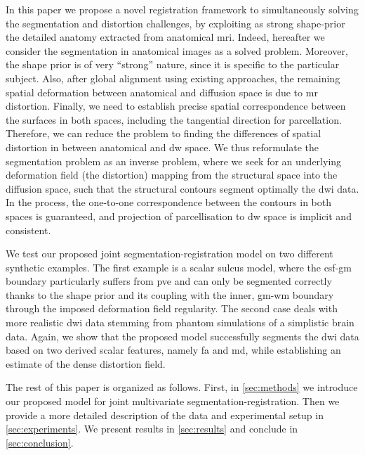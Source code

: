 In this paper we propose a novel registration framework to simultaneously
solving the segmentation and distortion challenges, by exploiting as strong 
shape-prior the detailed anatomy extracted from anatomical \gls{mri}. Indeed,
hereafter we consider the segmentation in anatomical images as a solved problem.
Moreover, the shape prior is of very ``strong'' nature, since it is specific to 
the particular subject. Also, after global alignment using existing approaches, 
the remaining spatial deformation between anatomical and diffusion space is 
due to \gls{mr} distortion. Finally, we need to establish precise spatial 
correspondence between the surfaces in both spaces, including the tangential 
direction for parcellation. Therefore, we can reduce the problem to finding 
the differences of spatial distortion in between anatomical and \gls{dw} space.
We thus reformulate the segmentation problem as an inverse problem, where we 
seek for an underlying deformation field (the distortion) mapping 
from the structural space into the diffusion space, such that the structural 
contours segment optimally the \gls{dwi} data. In the process, the one-to-one 
correspondence between the contours in both spaces is guaranteed, and projection 
of parcellisation to \gls{dw} space is implicit and consistent.

We test our proposed joint segmentation-registration model on two different 
synthetic examples. The first example is a scalar sulcus model, where the 
\gls{csf}-\gls{gm} boundary particularly suffers from \gls{pve} and can only be 
segmented correctly thanks to the shape prior and its coupling with the inner, 
\gls{gm}-\gls{wm} boundary through the imposed deformation field regularity. 
The second case deals with more realistic \gls{dwi} data stemming from 
phantom simulations of a simplistic brain data. Again, we show that the 
proposed model successfully segments the \gls{dwi} data based on two derived 
scalar features, namely \gls{fa} and \gls{md}, while establishing an estimate 
of the dense distortion field.

The rest of this paper is organized as follows. First, in \autoref{sec:methods}
we introduce our proposed model for joint multivariate segmentation-registration.
Then we provide a more detailed description of the data and experimental setup in
\autoref{sec:experiments}. We present results in \autoref{sec:results} and conclude 
in \autoref{sec:conclusion}.